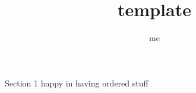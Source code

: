 \documentclass[10pt]{article}
\title {template}
\author {me}
\begin{document}
\maketitle
\begin{section}{Section 1}
happy in having ordered stuff
\end{section}
\end{document}
